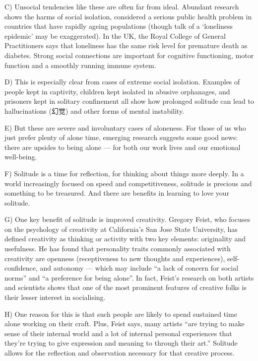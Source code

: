 \documentclass[UTF8,11pt]{ctexart}
\begin{document}
C) Unsocial tendencies like these are often far from ideal. Abundant research shows the harms of social isolation, considered a serious public health problem in countries that have rapidly ageing populations (though talk of a ‘loneliness epidemic’ may be exaggerated). In the UK, the Royal College of General Practitioners says that loneliness has the same risk level for premature death as diabetes. Strong social connections are important for cognitive functioning, motor function and a smoothly running immune system.


D) This is especially clear from cases of extreme social isolation. Examples of people kept in captivity, children kept isolated in abusive orphanages, and prisoners kept in solitary confinement all show how prolonged solitude can lead to hallucinations (幻觉) and other forms of mental instability.


E) But these are severe and involuntary cases of aloneness. For those of us who just prefer plenty of alone time, emerging research suggests some good news: there are upsides to being alone — for both our work lives and our emotional well-being.


F) Solitude is a time for reflection, for thinking about things more deeply. In a world increasingly focused on speed and competitiveness, solitude is precious and something to be treasured. And there are benefits in learning to love your solitude.


G) One key benefit of solitude is improved creativity. Gregory Feist, who focuses on the psychology of creativity at California’s San Jose State University, has defined creativity as thinking or activity with two key elements: originality and usefulness. He has found that personality traits commonly associated with creativity are openness (receptiveness to new thoughts and experiences), self-confidence, and autonomy — which may include “a lack of concern for social norms” and “a preference for being alone”. In fact, Feist’s research on both artists and scientists shows that one of the most prominent features of creative folks is their lesser interest in socialising.


H) One reason for this is that such people are likely to spend sustained time alone working on their craft. Plus, Feist says, many artists “are trying to make sense of their internal world and a lot of internal personal experiences that they’re trying to give expression and meaning to through their art.” Solitude allows for the reflection and observation necessary for that creative process.
\end{document}
